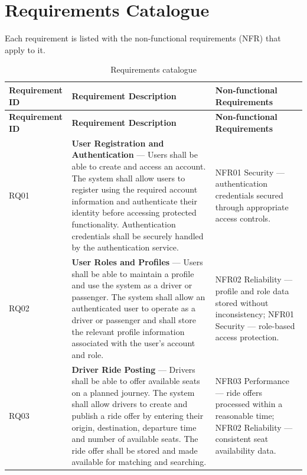 \chapter{Requirements Catalogue}
\label{app:catalogue}

Each requirement is listed with the non-functional requirements (NFR) that apply to it.

\begin{longtable}{|>{\raggedright\arraybackslash}p{}
                   |>{\raggedright\arraybackslash}p{}
                   |>{\raggedright\arraybackslash}p{}|}
\caption{Requirements catalogue}\label{tab:catalogue}\\
\hline
\textbf{Requirement ID} & \textbf{Requirement Description} & \textbf{Non-functional Requirements} \\
\hline
\endfirsthead
\hline
\textbf{Requirement ID} & \textbf{Requirement Description} & \textbf{Non-functional Requirements} \\
\hline
\endhead
\hline
\endfoot

RQ01 & \textbf{User Registration and Authentication} --- Users shall be able to create and access an account. The system shall allow users to register using the required account information and authenticate their identity before accessing protected functionality. Authentication credentials shall be securely handled by the authentication service. & NFR01 Security --- authentication credentials secured through appropriate access controls. \\
\hline

RQ02 & \textbf{User Roles and Profiles} --- Users shall be able to maintain a profile and use the system as a driver or passenger. The system shall allow an authenticated user to operate as a driver or passenger and shall store the relevant profile information associated with the user's account and role. & NFR02 Reliability --- profile and role data stored without inconsistency; \newline NFR01 Security --- role-based access protection. \\
\hline

RQ03 & \textbf{Driver Ride Posting} --- Drivers shall be able to offer available seats on a planned journey. The system shall allow drivers to create and publish a ride offer by entering their origin, destination, departure time and number of available seats. The ride offer shall be stored and made available for matching and searching. & NFR03 Performance --- ride offers processed within a reasonable time; \newline NFR02 Reliability --- consistent seat availability data. \\
\hline


\end{longtable}
